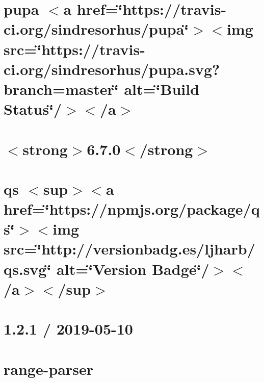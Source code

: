 \let\mypdfximage\pdfximage\def\pdfximage{\immediate\mypdfximage}\documentclass[twoside]{book}
\newcommand{\+}{\discretionary{\mbox{\scriptsize$\hookleftarrow$}}{}{}}
\begin{document}
\chapter{pupa $<$a href=\char`\"{}https\+://travis-\/ci.\+org/sindresorhus/pupa\char`\"{}$>$$<$img src=\char`\"{}https\+://travis-\/ci.\+org/sindresorhus/pupa.\+svg?branch=master\char`\"{} alt=\char`\"{}\+Build Status\char`\"{}/$>$$<$/a$>$}
\label{md__c_1__git_hub__p_r_o_y_e_c_t_o-_i_i_i-_g_o_t_rest-api-node-mysql_node_modules_pupa_readme}

\chapter{$<$strong$>$6.7.0$<$/strong$>$}
\label{md__c_1__git_hub__p_r_o_y_e_c_t_o-_i_i_i-_g_o_t_rest-api-node-mysql_node_modules_qs__c_h_a_n_g_e_l_o_g}

\chapter{qs $<$sup$>$$<$a href=\char`\"{}https\+://npmjs.\+org/package/qs\char`\"{}$>$$<$img src=\char`\"{}http\+://versionbadg.\+es/ljharb/qs.\+svg\char`\"{} alt=\char`\"{}\+Version Badge\char`\"{}/$>$$<$/a$>$$<$/sup$>$}
\label{md__c_1__git_hub__p_r_o_y_e_c_t_o-_i_i_i-_g_o_t_rest-api-node-mysql_node_modules_qs__r_e_a_d_m_e}

\chapter{1.2.1 / 2019-\/05-\/10}
\label{md__c_1__git_hub__p_r_o_y_e_c_t_o-_i_i_i-_g_o_t_rest-api-node-mysql_node_modules_range-parser__h_i_s_t_o_r_y}

\chapter{range-\/parser}
\label{md__c_1__git_hub__p_r_o_y_e_c_t_o-_i_i_i-_g_o_t_rest-api-node-mysql_node_modules_range-parser__r_e_a_d_m_e}

\end{document}
